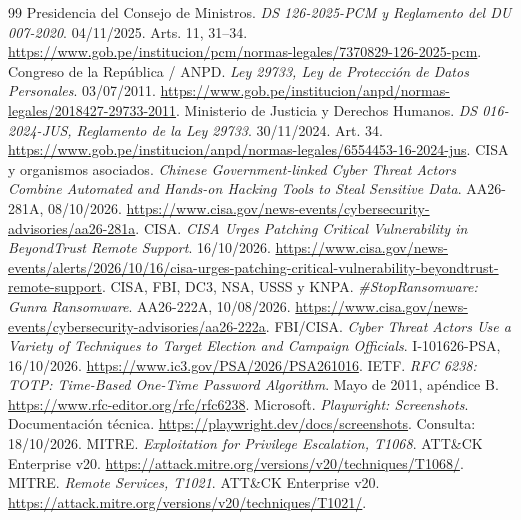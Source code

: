 \documentclass[10pt,a4paper]{article}
\begin{document}
\begin{thebibliography}{99}
 Presidencia del Consejo de Ministros. \emph{DS 126-2025-PCM y Reglamento del DU 007-2020}. 04/11/2025. Arts. 11, 31--34. \url{https://www.gob.pe/institucion/pcm/normas-legales/7370829-126-2025-pcm}.
 Congreso de la República / ANPD. \emph{Ley 29733, Ley de Protección de Datos Personales}. 03/07/2011. \url{https://www.gob.pe/institucion/anpd/normas-legales/2018427-29733-2011}.
 Ministerio de Justicia y Derechos Humanos. \emph{DS 016-2024-JUS, Reglamento de la Ley 29733}. 30/11/2024. Art. 34. \url{https://www.gob.pe/institucion/anpd/normas-legales/6554453-16-2024-jus}.
 CISA y organismos asociados. \emph{Chinese Government-linked Cyber Threat Actors Combine Automated and Hands-on Hacking Tools to Steal Sensitive Data}. AA26-281A, 08/10/2026. \url{https://www.cisa.gov/news-events/cybersecurity-advisories/aa26-281a}.
 CISA. \emph{CISA Urges Patching Critical Vulnerability in BeyondTrust Remote Support}. 16/10/2026. \url{https://www.cisa.gov/news-events/alerts/2026/10/16/cisa-urges-patching-critical-vulnerability-beyondtrust-remote-support}.
 CISA, FBI, DC3, NSA, USSS y KNPA. \emph{\#StopRansomware: Gunra Ransomware}. AA26-222A, 10/08/2026. \url{https://www.cisa.gov/news-events/cybersecurity-advisories/aa26-222a}.
 FBI/CISA. \emph{Cyber Threat Actors Use a Variety of Techniques to Target Election and Campaign Officials}. I-101626-PSA, 16/10/2026. \url{https://www.ic3.gov/PSA/2026/PSA261016}.
 IETF. \emph{RFC 6238: TOTP: Time-Based One-Time Password Algorithm}. Mayo de 2011, apéndice B. \url{https://www.rfc-editor.org/rfc/rfc6238}.
 Microsoft. \emph{Playwright: Screenshots}. Documentación técnica. \url{https://playwright.dev/docs/screenshots}. Consulta: 18/10/2026.
 MITRE. \emph{Exploitation for Privilege Escalation, T1068}. ATT\&CK Enterprise v20. \url{https://attack.mitre.org/versions/v20/techniques/T1068/}.
 MITRE. \emph{Remote Services, T1021}. ATT\&CK Enterprise v20. \url{https://attack.mitre.org/versions/v20/techniques/T1021/}.
\end{thebibliography}
\end{document}
